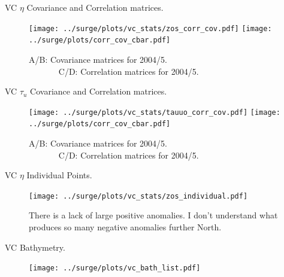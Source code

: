 \begin{frame}{VC $\eta$ Covariance and Correlation matrices. }
\vspace{-20pt}
\begin{figure}[htb!]
  \centering
  \hspace{-10pt}
  \texttt{[image: ../surge/plots/vc\_stats/zos\_corr\_cov.pdf]}
          \texttt{[image: ../surge/plots/corr\_cov\_cbar.pdf]}
  \vspace{-7pt}
  \caption{A/B: Covariance matrices for 2004/5.\\
           $\quad\quad\quad\;\;$C/D: Correlation matrices for 2004/5.}
  \label{fig:}
\end{figure}
\end{frame}


\begin{frame}{VC $\tau_u$ Covariance and Correlation matrices. }
\vspace{-20pt}
\begin{figure}[htb!]
  \centering
  \hspace{-10pt}
  \texttt{[image: ../surge/plots/vc\_stats/tauuo\_corr\_cov.pdf]}
          \texttt{[image: ../surge/plots/corr\_cov\_cbar.pdf]}
  \vspace{-7pt}
  \caption{A/B: Covariance matrices for 2004/5.\\
           $\quad\quad\quad\;\;$C/D: Correlation matrices for 2004/5.}
  \label{fig:}
\end{figure}
\end{frame}

\begin{frame}{VC $\eta$ Individual Points. }
\vspace{-20pt}
\begin{figure}[htb!]
  \centering
  \hspace{-10pt}
  \texttt{[image: ../surge/plots/vc\_stats/zos\_individual.pdf]}
  \vspace{-7pt}
  \caption{There is a lack of large positive anomalies. I don't understand what
   produces so many negative anomalies further North.}
  \label{fig:}
\end{figure}
\end{frame}


\begin{frame}{VC Bathymetry. }
\vspace{-20pt}
\begin{figure}[htb!]
  \centering
  \hspace{-10pt}
  \texttt{[image: ../surge/plots/vc\_bath\_list.pdf]}
  \vspace{-7pt}
  \caption{}
  \label{fig:}
\end{figure}
\end{frame}



